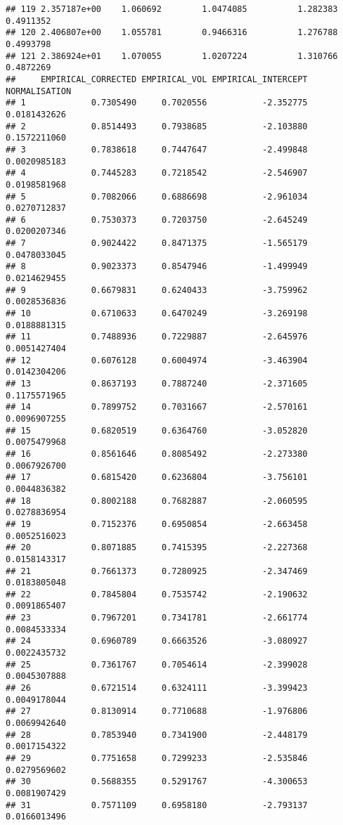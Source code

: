 \documentclass[]{article}
\begin{document}
\begin{verbatim}
## 119 2.357187e+00    1.060692        1.0474085          1.282383 0.4911352
## 120 2.406807e+00    1.055781        0.9466316          1.276788 0.4993798
## 121 2.386924e+01    1.070055        1.0207224          1.310766 0.4872269
##     EMPIRICAL_CORRECTED EMPIRICAL_VOL EMPIRICAL_INTERCEPT NORMALISATION
## 1             0.7305490     0.7020556           -2.352775  0.0181432626
## 2             0.8514493     0.7938685           -2.103880  0.1572211060
## 3             0.7838618     0.7447647           -2.499848  0.0020985183
## 4             0.7445283     0.7218542           -2.546907  0.0198581968
## 5             0.7082066     0.6886698           -2.961034  0.0270712837
## 6             0.7530373     0.7203750           -2.645249  0.0200207346
## 7             0.9024422     0.8471375           -1.565179  0.0478033045
## 8             0.9023373     0.8547946           -1.499949  0.0214629455
## 9             0.6679831     0.6240433           -3.759962  0.0028536836
## 10            0.6710633     0.6470249           -3.269198  0.0188881315
## 11            0.7488936     0.7229887           -2.645976  0.0051427404
## 12            0.6076128     0.6004974           -3.463904  0.0142304206
## 13            0.8637193     0.7887240           -2.371605  0.1175571965
## 14            0.7899752     0.7031667           -2.570161  0.0096907255
## 15            0.6820519     0.6364760           -3.052820  0.0075479968
## 16            0.8561646     0.8085492           -2.273380  0.0067926700
## 17            0.6815420     0.6236804           -3.756101  0.0044836382
## 18            0.8002188     0.7682887           -2.060595  0.0278836954
## 19            0.7152376     0.6950854           -2.663458  0.0052516023
## 20            0.8071885     0.7415395           -2.227368  0.0158143317
## 21            0.7661373     0.7280925           -2.347469  0.0183805048
## 22            0.7845804     0.7535742           -2.190632  0.0091865407
## 23            0.7967201     0.7341781           -2.661774  0.0084533334
## 24            0.6960789     0.6663526           -3.080927  0.0022435732
## 25            0.7361767     0.7054614           -2.399028  0.0045307888
## 26            0.6721514     0.6324111           -3.399423  0.0049178044
## 27            0.8130914     0.7710688           -1.976806  0.0069942640
## 28            0.7853940     0.7341900           -2.448179  0.0017154322
## 29            0.7751658     0.7299233           -2.535846  0.0279569602
## 30            0.5688355     0.5291767           -4.300653  0.0081907429
## 31            0.7571109     0.6958180           -2.793137  0.0166013496

\end{verbatim}
\end{document}
